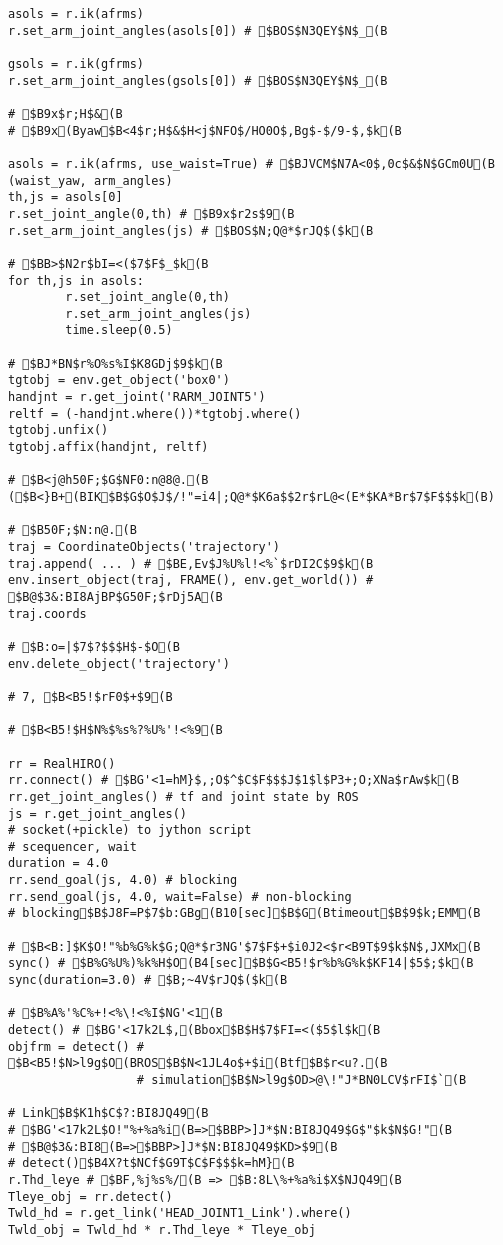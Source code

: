 \documentclass[11pt]{jreport}
\begin{document}
{{{{{{{{{{{{{{{\begin{verbatim}
asols = r.ik(afrms)
r.set_arm_joint_angles(asols[0]) # $BOS$N3QEY$N$_(B

gsols = r.ik(gfrms)
r.set_arm_joint_angles(gsols[0]) # $BOS$N3QEY$N$_(B

# $B9x$r;H$&(B
# $B9x(Byaw$B<4$r;H$&$H<j$NFO$/HO0O$,Bg$-$/9-$,$k(B

asols = r.ik(afrms, use_waist=True) # $BJVCM$N7A<0$,0c$&$N$GCm0U(B (waist_yaw, arm_angles)
th,js = asols[0]
r.set_joint_angle(0,th) # $B9x$r2s$9(B
r.set_arm_joint_angles(js) # $BOS$N;Q@*$rJQ$($k(B

# $BB>$N2r$bI=<($7$F$_$k(B
for th,js in asols:
        r.set_joint_angle(0,th)
        r.set_arm_joint_angles(js)
        time.sleep(0.5)

# $BJ*BN$r%O%s%I$K8GDj$9$k(B
tgtobj = env.get_object('box0')
handjnt = r.get_joint('RARM_JOINT5')
reltf = (-handjnt.where())*tgtobj.where()
tgtobj.unfix()
tgtobj.affix(handjnt, reltf)

# $B<j@h50F;$G$NF0:n@8@.(B ($B<}B+(BIK$B$G$O$J$/!"=i4|;Q@*$K6a$$2r$rL@<(E*$KA*Br$7$F$$$k(B)

# $B50F;$N:n@.(B
traj = CoordinateObjects('trajectory')
traj.append( ... ) # $BE,Ev$J%U%l!<%`$rDI2C$9$k(B
env.insert_object(traj, FRAME(), env.get_world()) # $B@$3&:BI8AjBP$G50F;$rDj5A(B
traj.coords

# $B:o=|$7$?$$$H$-$O(B
env.delete_object('trajectory')

# 7, $B<B5!$rF0$+$9(B

# $B<B5!$H$N%$%s%?%U%'!<%9(B

rr = RealHIRO()
rr.connect() # $BG'<1=hM}$,;O$^$C$F$$$J$1$l$P3+;O;XNa$rAw$k(B
rr.get_joint_angles() # tf and joint state by ROS
js = r.get_joint_angles()
# socket(+pickle) to jython script
# scequencer, wait
duration = 4.0
rr.send_goal(js, 4.0) # blocking
rr.send_goal(js, 4.0, wait=False) # non-blocking
# blocking$B$J8F=P$7$b:GBg(B10[sec]$B$G(Btimeout$B$9$k;EMM(B

# $B<B:]$K$O!"%b%G%k$G;Q@*$r3NG'$7$F$+$i0J2<$r<B9T$9$k$N$,JXMx(B
sync() # $B%G%U%)%k%H$O(B4[sec]$B$G<B5!$r%b%G%k$KF14|$5$;$k(B
sync(duration=3.0) # $B;~4V$rJQ$($k(B

# $B%A%'%C%+!<%\!<%I$NG'<1(B
detect() # $BG'<17k2L$,(Bbox$B$H$7$FI=<($5$l$k(B
objfrm = detect() # $B<B5!$N>l9g$O(BROS$B$N<1JL4o$+$i(Btf$B$r<u?.(B
                  # simulation$B$N>l9g$OD>@\!"J*BN0LCV$rFI$`(B

# Link$B$K1h$C$?:BI8JQ49(B
# $BG'<17k2L$O!"%+%a%i(B=>$BBP>]J*$N:BI8JQ49$G$"$k$N$G!"(B
# $B@$3&:BI8(B=>$BBP>]J*$N:BI8JQ49$KD>$9(B
# detect()$B4X?t$NCf$G9T$C$F$$$k=hM}(B
r.Thd_leye # $BF,%j%s%/(B => $B:8L\%+%a%i$X$NJQ49(B
Tleye_obj = rr.detect()
Twld_hd = r.get_link('HEAD_JOINT1_Link').where()
Twld_obj = Twld_hd * r.Thd_leye * Tleye_obj



\end{verbatim}}}}}}}}}}}}}}}}
\end{document}
